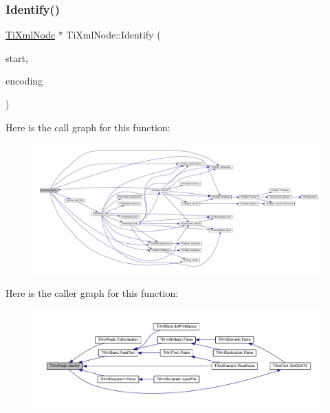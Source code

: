 \mbox{\label{class_ti_xml_node_ac1e3a8e7578be463b04617786120c2bb}} 
\subsubsection{\texorpdfstring{Identify()}{Identify()}}
{\footnotesize\ttfamily \hyperlink{class_ti_xml_node}{Ti\+Xml\+Node} $\ast$ Ti\+Xml\+Node\+::\+Identify (\begin{DoxyParamCaption}\item[{const char $\ast$}]{start,  }\item[{\hyperlink{tinyxml_8h_a88d51847a13ee0f4b4d320d03d2c4d96}{Ti\+Xml\+Encoding}}]{encoding }\end{DoxyParamCaption})\hspace{0.3cm}{\ttfamily [protected]}}

Here is the call graph for this function\+:\nopagebreak
\begin{figure}[H]
\begin{center}
\leavevmode
\includegraphics[width=350pt]{class_ti_xml_node_ac1e3a8e7578be463b04617786120c2bb_cgraph}
\end{center}
\end{figure}
Here is the caller graph for this function\+:\nopagebreak
\begin{figure}[H]
\begin{center}
\leavevmode
\includegraphics[width=350pt]{class_ti_xml_node_ac1e3a8e7578be463b04617786120c2bb_icgraph}
\end{center}
\end{figure}
\mbox{\label{class_ti_xml_node_a274db3292218202805c093f66a964cb5}} 
